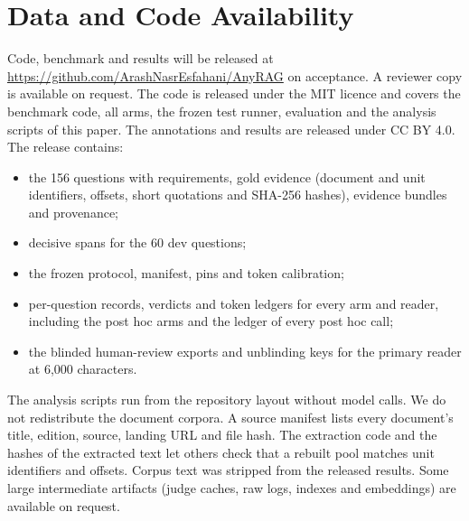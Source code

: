 \section*{Data and Code Availability}
\label{sec:availability}

Code, benchmark and results will be released at \url{https://github.com/ArashNasrEsfahani/AnyRAG} on acceptance. A reviewer copy is available on request. The code is released under the MIT licence and covers the benchmark code, all arms, the frozen test runner, evaluation and the analysis scripts of this paper. The annotations and results are released under CC BY 4.0. The release contains:
\begin{itemize}
  \item the 156 questions with requirements, gold evidence (document and unit identifiers, offsets, short quotations and SHA-256 hashes), evidence bundles and provenance;
  \item decisive spans for the 60 dev questions;
  \item the frozen protocol, manifest, pins and token calibration;
  \item per-question records, verdicts and token ledgers for every arm and reader, including the post hoc arms and the ledger of every post hoc call;
  \item the blinded human-review exports and unblinding keys for the primary reader at 6,000 characters.
\end{itemize}
The analysis scripts run from the repository layout without model calls. We do not redistribute the document corpora. A source manifest lists every document's title, edition, source, landing URL and file hash. The extraction code and the hashes of the extracted text let others check that a rebuilt pool matches unit identifiers and offsets. Corpus text was stripped from the released results. Some large intermediate artifacts (judge caches, raw logs, indexes and embeddings) are available on request.
